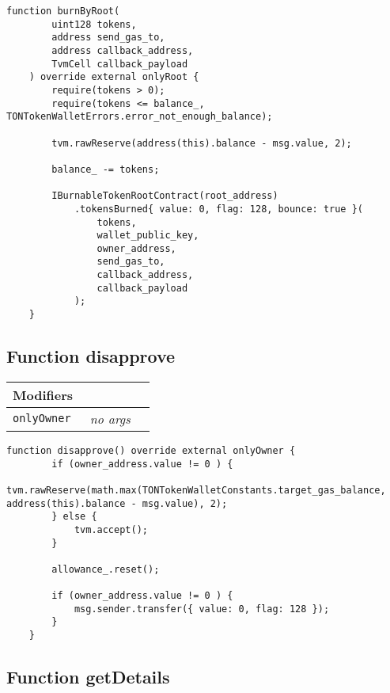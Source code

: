 \vspace{2cm}

\begin{lstlisting}[firstnumber=520]
    function burnByRoot(
        uint128 tokens,
        address send_gas_to,
        address callback_address,
        TvmCell callback_payload
    ) override external onlyRoot {
        require(tokens > 0);
        require(tokens <= balance_, TONTokenWalletErrors.error_not_enough_balance);

        tvm.rawReserve(address(this).balance - msg.value, 2);

        balance_ -= tokens;

        IBurnableTokenRootContract(root_address)
            .tokensBurned{ value: 0, flag: 128, bounce: true }(
                tokens,
                wallet_public_key,
                owner_address,
                send_gas_to,
                callback_address,
                callback_payload
            );
    }
\end{lstlisting}

\subsection{Function disapprove}


\ifsoltables
\noindent\begin{tabular}{|l|l|p{5cm}|}\hline
\multicolumn{3}{|l|}{\bf Modifiers}\\\hline
\tt onlyOwner & {\em no args} &\\\hline
\end{tabular}
\fi

\vspace{2cm}

\begin{lstlisting}[firstnumber=148]
    function disapprove() override external onlyOwner {
        if (owner_address.value != 0 ) {
            tvm.rawReserve(math.max(TONTokenWalletConstants.target_gas_balance, address(this).balance - msg.value), 2);
        } else {
            tvm.accept();
        }

        allowance_.reset();

        if (owner_address.value != 0 ) {
            msg.sender.transfer({ value: 0, flag: 128 });
        }
    }
\end{lstlisting}

\subsection{Function getDetails}


